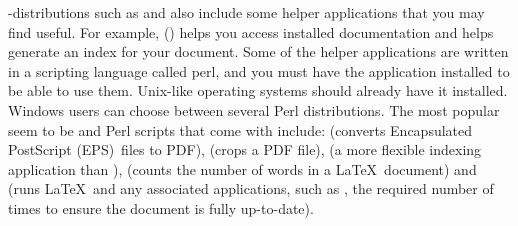 -distributions such as  and  also 
include some helper applications that you may find useful. For example,
 () helps you access
installed documentation and  helps generate an
index for your document. Some of the helper applications are
written in a scripting language called \gls*{perl}, and you must
have the  application installed to be able to use
them. Unix-like operating systems should already have it installed.
Windows users can choose between several Perl distributions. The
most popular seem to be  and 
 Perl scripts that come
with  include:  (converts Encapsulated
PostScript (EPS)\indexEPS\ files to PDF),  (crops
a PDF file),  (a more flexible indexing application
than ),  (counts the number
of words in a \LaTeX\ document) and  (runs \LaTeX\
and any associated applications, such as , the
required number of times to ensure the document is fully
up-to-date).


